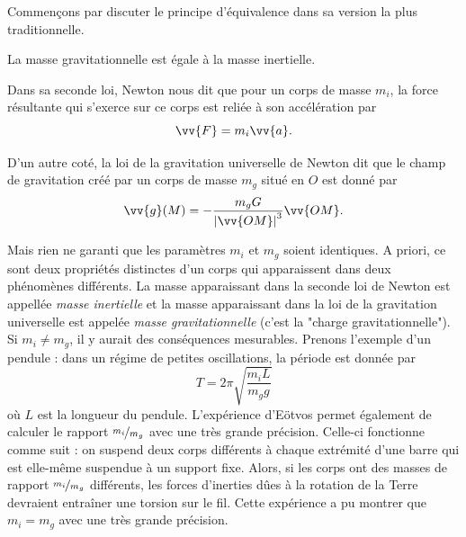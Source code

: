 \documentclass[a4paper,11pt]{report}
\begin{document}
            Commençons par discuter le principe d'équivalence dans sa version la plus traditionnelle.
            
            \begin{prin}
            \begin{leftbar}
                La masse gravitationnelle est égale à la masse inertielle.
            \end{leftbar}
            \end{prin}
            
            Dans sa seconde loi, Newton nous dit que pour un corps de masse $m_i$, la force résultante qui s'exerce sur ce corps est reliée à son accélération par
            \begin{equation}
                \vv{F} = m_i\vv{a}.
            \end{equation}
            
            D'un autre coté, la loi de la gravitation universelle de Newton dit que le champ de gravitation créé par un corps de masse $m_g$ situé en $O$ est donné par
            \begin{equation}
                \vv{g}(M) = -\frac{m_g G}{\abs{\vv{OM}}^3}\vv{OM}.
            \end{equation}
            
            Mais rien ne garanti que les paramètres $m_i$ et $m_g$ soient identiques. A priori, ce sont deux propriétés distinctes d'un corps qui apparaissent dans deux phénomènes différents. La masse apparaissant dans la seconde loi de Newton est appellée \textit{masse inertielle} et la masse apparaissant dans la loi de la gravitation universelle est appelée \textit{masse gravitationnelle} (c'est la "charge gravitationnelle").\\
            
            Si $m_i\neq m_g$, il y aurait des conséquences mesurables. Prenons l'exemple d'un pendule : dans un régime de petites oscillations, la période est donnée par
            \begin{equation}
                T = 2\pi\sqrt{\frac{m_iL}{m_g g}}
            \end{equation}
            où $L$ est la longueur du pendule. L'expérience d'Eötvos permet également de calculer le rapport $\nicefrac{m_i}{m_g}$ avec une très grande précision. Celle-ci fonctionne comme suit : on suspend deux corps différents à chaque extrémité d'une barre qui est elle-même suspendue à un support fixe. Alors, si les corps ont des masses de rapport $\nicefrac{m_{i}}{m_g}$ différents, les forces d'inerties dûes à la rotation de la Terre devraient entraîner une torsion sur le fil. Cette expérience a pu montrer que $m_i = m_g$ avec une très grande précision.\\
            
\end{document}
